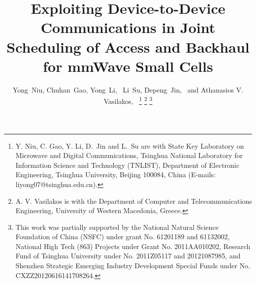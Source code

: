\documentclass[journal]{IEEEtran}
\begin{document}
\title{Exploiting Device-to-Device Communications in Joint Scheduling of Access and Backhaul for mmWave Small Cells}




\author{Yong~Niu,
         Chuhan~Gao,
         Yong~Li,~
         Li~Su,
         Depeng~Jin,~
        and Athanasios V. Vasilakos,~
\thanks{Y. Niu, C. Gao, Y. Li, D.~Jin and L.~Su are with State Key Laboratory on
 Microwave and Digital Communications, Tsinghua National Laboratory for Information
 Science and Technology (TNLIST), Department of Electronic Engineering, Tsinghua
 University, Beijing 100084, China (E-mails: liyong07@tsinghua.edu.cn).} \thanks{A. V. Vasilakos is with the Department of Computer and Telecommunications Engineering,
 University of Western Macedonia, Greece.} \thanks{This work was partially supported by the National Natural Science
Foundation of China (NSFC) under grant No. 61201189 and 61132002, National High Tech (863) Projects
under Grant No. 2011AA010202, Research Fund of Tsinghua University under No. 2011Z05117 and
20121087985, and Shenzhen Strategic Emerging Industry Development Special Funds under No.
CXZZ20120616141708264.}
}


\maketitle
\end{document}
